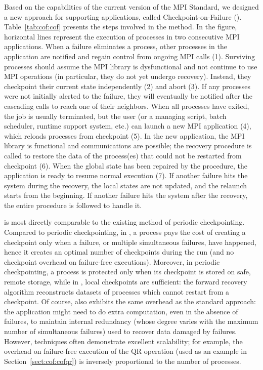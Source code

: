 Based on the capabilities of the current version of the MPI Standard, we
designed a new approach for supporting \abft applications, called
Checkpoint-on-Failure (\cof). Table~\ref{tab:cof:cof} presents the steps
involved in the \cof method. In the figure, horizontal lines represent the
execution of processes in two consecutive MPI applications. When a failure
eliminates a process, other processes in the application are notified and regain control from
ongoing MPI calls (1). Surviving processes should assume the MPI library is
dysfunctional and not continue to use MPI operations (in particular, they do
not yet undergo \abft recovery). Instead, they checkpoint their current state
independently (2) and abort (3). If any processes were not initially alerted to
the failure, they will eventually be notified after the cascading calls to
 reach one of their neighbors. When all processes have exited,
the job is usually terminated, but the user (or a managing script, batch
scheduler, runtime support system, etc.) can launch a new MPI application (4),
which reloads processes from checkpoint (5). In the new application, the MPI
library is functional and communications are possible; the \abft recovery
procedure is called to restore the data of the process(es) that could not be
restarted from checkpoint (6). When the global state has been repaired by the
\abft procedure, the application is ready to resume normal execution (7). If another
failure hits the system during the recovery, the local states are not updated,
and the relaunch starts from the beginning. If another failure hits the system
after the \abft recovery, the entire procedure is followed to handle it.

\cof is most directly comparable to the existing method of periodic checkpointing.
Compared to periodic checkpointing, in \cof, a process pays the cost of creating
a checkpoint only when a failure, or multiple simultaneous failures, have
happened, hence it creates an optimal number of checkpoints during the run (and
no checkpoint overhead on failure-free executions). Moreover, in periodic
checkpointing, a process is protected only when its checkpoint is stored on
safe, remote storage, while in \cof, local checkpoints are sufficient: the
forward recovery algorithm reconstructs datasets of processes which cannot
restart from a checkpoint. Of course, \cof also exhibits the same overhead as
the standard \abft approach: the application might need to do extra computation,
even in the absence of failures, to maintain internal redundancy (whose degree
varies with the maximum number of simultaneous failures) used to recover data
damaged by failures. However, \abft techniques often demonstrate excellent
scalability; for example, the overhead on failure-free execution of the \abft QR
operation (used as an example in Section~\ref{sect:cof:cofqr}) is inversely
proportional to the number of processes.

